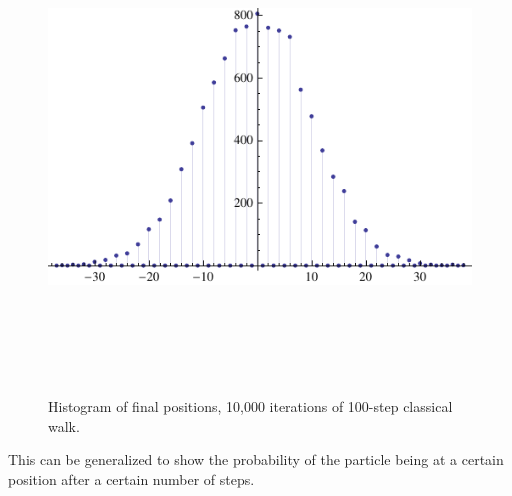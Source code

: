 \documentclass[a0,portrait]{a0poster}
\begin{document}
\begin{center}
{\begin{figure}
\includegraphics[height=130mm]{classic-10k-of-100-itterations.pdf}
\caption{Histogram of final positions, 10,000 iterations of 100-step classical walk.}
\label{clas_10k}
\end{figure}    

This can be generalized to show the probability of the particle being at a certain position after a certain number of steps\cite{Ke:2003}.

}
\end{center}
\end{document}
